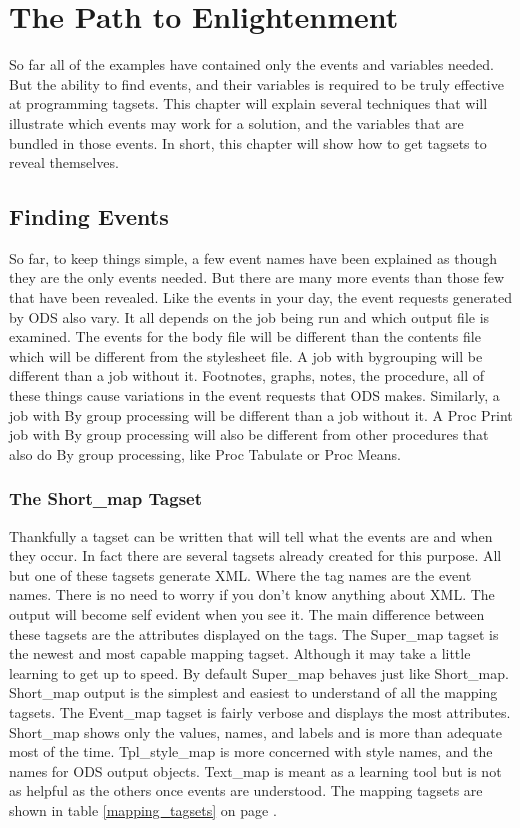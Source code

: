 \chapter{The Path to Enlightenment}
So far all of the examples have contained only the events and
variables needed.  But the ability to find events, and their
variables is required to be truly effective at programming
tagsets.  This chapter will explain several techniques that
will illustrate which events
may work for a solution, and the variables that are bundled in
those events.  In short, this chapter will show how to get 
tagsets to reveal themselves.

\section{Finding Events}
So far, to keep things simple, a few event names have been explained as
though they are the only events needed.
But there are many more events than those few that have been
revealed.  Like the events in your day, the event requests generated
by ODS also vary.  It all depends on the job being run
and which output file is examined.  The events for the body
file will be different than the contents file which will 
be different from the stylesheet file.  A job with bygrouping
will be different than a job without it.  Footnotes, graphs,
notes, the procedure,  all of these things cause variations
in the event requests that ODS makes.  Similarly, a job with
By group processing will be different than a job without it.
A Proc Print job with By group processing will also be different
from other procedures that also do By group processing, like Proc
Tabulate or Proc Means.  

\subsection{The Short\_map Tagset}
Thankfully a tagset can be written that will tell
what the events are and when they occur.  In fact
there are several tagsets already created for this purpose.
All but one of these tagsets generate XML.  Where the tag
names are the event names.  
There is no need to worry if you don't know anything about
XML.  The output will become self evident when you see it.
The main difference between
these tagsets are the attributes displayed on the tags.
The Super\_map tagset is the newest and most capable mapping
tagset.  Although it may take a little learning
to get up to speed.  By default Super\_map behaves just 
like Short\_map.  Short\_map output is the simplest and easiest
to understand of all the mapping tagsets.
The Event\_map tagset is fairly verbose and displays the 
most attributes.
Short\_map shows only the values, names, and labels and is
more than adequate most of the time.  Tpl\_style\_map is
more concerned with style names, and the names for ODS output
objects. Text\_map is meant as a learning tool but is not as
helpful as the others once events are understood.  
The mapping
tagsets are shown in table \ref{mapping_tagsets} on page \pageref{mapping_tagsets}.

